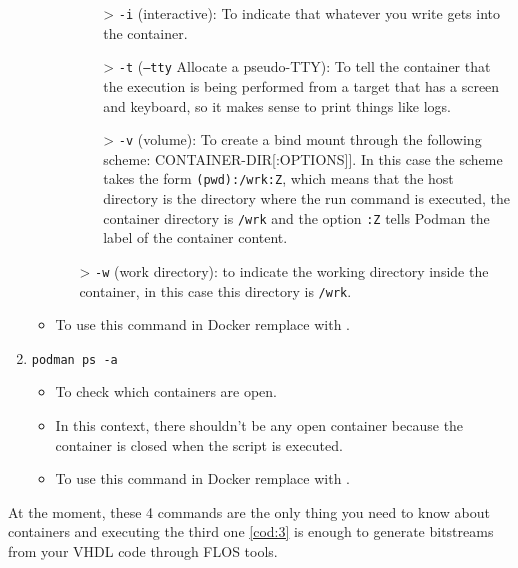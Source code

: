 \begin{enumerate}
\begin{itemize}
\begin{itemize}
            \begin{itemize}
                \item[>] \texttt{-i} (interactive): To indicate that whatever you write gets into the container.
                \item[>] \texttt{-t} (\texttt{--tty} Allocate a pseudo-TTY): To tell the container that the execution is being performed from a target that has a screen and keyboard, so it makes sense to print things like logs.
                \item[>] \texttt{-v} (volume): To create a bind mount through the following scheme: {\fontsize{9.5}{30}\selectfont [[SOURCE-VOLUME|HOST-DIR:]CONTAINER-DIR[:OPTIONS]]}. 
In this case the scheme takes the form \texttt{(pwd):/wrk:Z}, which means that the host directory is the directory where the run command is executed, the container directory is \texttt{/wrk} and the option \texttt{:Z} tells Podman the label of the container content.
            \end{itemize}
        \item[>] \texttt{-w} (work directory): to indicate the working directory inside the container, in this case this directory is \texttt{/wrk}.
        \end{itemize}
    \item To use this command in Docker remplace  with . 
    \end{itemize}
\item \texttt{podman ps -a}
    \begin{itemize}
    \item To check which containers are open.
    \item In this context, there shouldn't be any open container because the container is closed when the script is executed.
    \item To use this command in Docker remplace  with . 
    \end{itemize}
\end{enumerate}

\noindent At the moment, these 4 commands are the only thing you need to know about containers and executing the third one \ref{cod:3} is enough to generate bitstreams from your VHDL code through FLOS tools.

